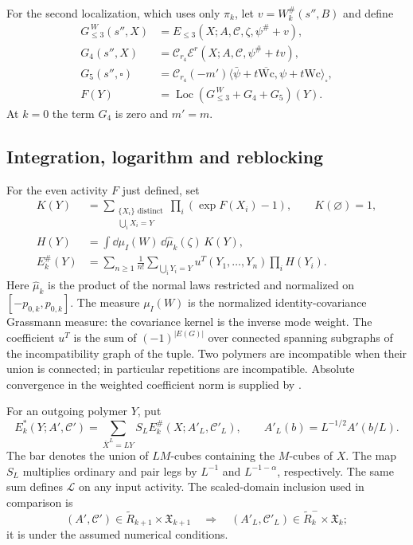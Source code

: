 For the second localization, which uses only $\pi_k$, let
$v=W_k^\#(s'',B)$ and define
\begin{align}
 G_{\le3}^{\,W}(s'',X)&=E_{\le3}(X;A,\mathscr C,\zeta,
                                                      \psi^\#+v),
                                      \label{eq:rgnl-GW}\\
 G_4(s'',X)&=\mathcal C_{r_4}
                  \mathscr E^r(X;A,\mathscr C,\psi^\#+tv),\\
 G_5(s'',\square)&=\mathcal C_{r_4}(-m')
                 \langle\bar\psi+t\overline{\mathrm{Wc}},
                                   \psi+t\mathrm{Wc}\rangle_\square,\\
 F(Y)&=\operatorname{Loc}(G_{\le3}^{\,W}+G_4+G_5)(Y).
                                      \label{eq:rgnl-finite-activity}
\end{align}
At $k=0$ the term $G_4$ is zero and $m'=m$.


\subsection{Integration, logarithm and reblocking}
For the even activity $F$ just defined, set
\begin{align*}
 K(Y)&=\sum_{\substack{\{X_i\}\text{ distinct}\\\bigcup_iX_i=Y}}
             \prod_i(\exp F(X_i)-1),\qquad K(\varnothing)=1,\\
 H(Y)&=\int\dd\mu_I(W)\,\dd\widehat\mu_k(\zeta)\,K(Y),\\
 E_k^\#(Y)&=\sum_{n\ge1}\frac1{n!}
       \sum_{\bigcup_iY_i=Y}u^T(Y_1,\ldots,Y_n)\prod_iH(Y_i).
\end{align*}
Here $\widehat\mu_k$ is the product of the normal laws restricted
and normalized on $[-p_{0,k},p_{0,k}]$. The measure $\mu_I(W)$ is
the normalized identity-covariance Grassmann measure: the covariance
kernel is the inverse mode weight. The coefficient $u^T$ is the
sum of $(-1)^{|E(G)|}$ over connected spanning subgraphs of the
incompatibility graph of the tuple. Two polymers are incompatible
when their union is connected; in particular repetitions are incompatible.
Absolute convergence in the weighted coefficient norm is supplied by
\cite[Proposition~6.1]{NonlinearStep}.

For an outgoing polymer $Y$, put
\[
 E_k^*(Y;A',\mathscr C')=\sum_{\bar X^L=LY}
              S_LE_k^\#(X;A'_L,\mathscr C'_L),\qquad
 A'_L(b)=L^{-1/2}A'(b/L).
\]
The bar denotes the union of $LM$-cubes containing the $M$-cubes of $X$.
The map $S_L$ multiplies ordinary and pair legs by $L^{-1}$ and
$L^{-1-\alpha}$, respectively. The same sum defines $\mathcal L$
on any input activity. The scaled-domain inclusion used in comparison is
\begin{equation}\label{eq:rg-scaled-domain-inclusion}
 (A',\mathscr C')\in\widetilde R_{k+1}\times\mathfrak X_{k+1}
 \quad\Longrightarrow\quad
 (A'_L,\mathscr C'_L)\in\widetilde R_k^-\times\mathfrak X_k;
\end{equation}
it is \cite[(29)]{NormalizedContraction} under the assumed numerical conditions.
